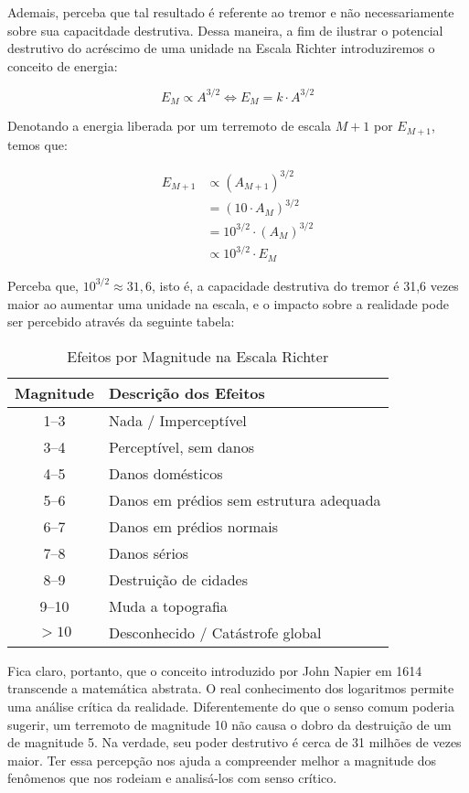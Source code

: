 Ademais, perceba que tal resultado é referente ao tremor e não necessariamente sobre sua capacitdade destrutiva. Dessa maneira, a fim de ilustrar o potencial destrutivo do acréscimo de uma unidade na Escala Richter introduziremos o conceito de energia:

\begin{equation*}
    E_M \propto A^{3/2} \iff E_M = k \cdot A^{3/2}
\end{equation*}

Denotando a energia liberada por um terremoto de escala $M+1$ por $E_{M+1}$, temos que:

\begin{align*}
    E_{M+1} &\propto (A_{M+1})^{3/2} \\
            &= (10 \cdot A_M)^{3/2} \\
            &= 10^{3/2} \cdot (A_M)^{3/2} \\
            &\propto 10^{3/2} \cdot E_M
\end{align*}

Perceba que, $10^{3/2} \approx 31,6$, isto é, a capacidade destrutiva do tremor é 31,6 vezes maior ao aumentar uma unidade na escala, e o impacto sobre a realidade pode ser percebido através da seguinte tabela:

\begin{table}[h!]
\centering
\caption{Efeitos por Magnitude na Escala Richter}
\label{tab:richter_simples}
\begin{tabular}{|c|l|}
\hline
\textbf{Magnitude} & \textbf{Descrição dos Efeitos} \\
\hline
1--3 & Nada / Imperceptível \\
3--4 & Perceptível, sem danos \\
4--5 & Danos domésticos \\
5--6 & Danos em prédios sem estrutura adequada \\
6--7 & Danos em prédios normais \\
7--8 & Danos sérios \\
8--9 & Destruição de cidades \\
9--10 & Muda a topografia \\
$>10$ & Desconhecido / Catástrofe global \\
\hline
\end{tabular}
\end{table}



Fica claro, portanto, que o conceito introduzido por John Napier em 1614 transcende a matemática abstrata. O real conhecimento dos logaritmos permite uma análise crítica da realidade. Diferentemente do que o senso comum poderia sugerir, um terremoto de magnitude 10 não causa o dobro da destruição de um de magnitude 5. Na verdade, seu poder destrutivo é cerca de 31 milhões de vezes maior. Ter essa percepção nos ajuda a compreender melhor a magnitude dos fenômenos que nos rodeiam e analisá-los com senso crítico.
